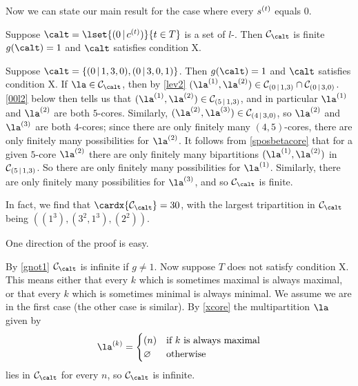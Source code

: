 \documentclass[a4paper, 11pt, twoside]{article}
\begin{document}
Now we can state our main result for the case where every $s^{(t)}$ equals $0$.

\smallskip
\begin{mdframed}[innerleftmargin=3pt,innerrightmargin=3pt,innertopmargin=-6pt,innerbottommargin=3pt,roundcorner=5pt,innermargin=-3pt,outermargin=-3pt]
\begin{thm}\label{mainall0}
Suppose $\calt=\lset{(0\,|\,\sof ct)}{t\in T}$ is a set of $l$-\mcds. Then $\smc\calt$ is finite \iff $g(\calt)=1$ and $\calt$ satisfies condition X.
\end{thm}
\end{mdframed}
\smallskip

\begin{eg}
Suppose $\calt=\{(0\,|\,1,3,0),(0\,|\,3,0,1)\}$. Then $g(\calt)=1$ and $\calt$ satisfies condition X. If $\la\in\smc\calt$, then by \cref{lev2} $(\la^{(1)},\la^{(2)})\in\mc0{1,3}\cap\mc0{3,0}$. \cref{00l2} below then tells us that $(\la^{(1)},\la^{(2)})\in\mc5{1,3}$, and in particular $\la^{(1)}$ and $\la^{(2)}$ are both $5$-cores. Similarly, $(\la^{(2)},\la^{(3)})\in\mc4{3,0}$, so $\la^{(2)}$ and $\la^{(3)}$ are both $4$-cores; since there are only finitely many $(4,5)$-cores, there are only finitely many possibilities for $\la^{(2)}$. It follows from \ref{sposbetacore} that for a given $5$-core $\la^{(2)}$ there are only finitely many bipartitions $(\la^{(1)},\la^{(2)})$ in $\mathcal{C}_{(5\,|\,1,3)}$. So there are only finitely many possibilities for $\la^{(1)}$. Similarly, there are only finitely many possibilities for $\la^{(3)}$, and so $\smc\calt$ is finite.

In fact, we find that $\cardx{\smc\calt}=30$, with the largest tripartition in $\smc\calt$ being $((1^3),(3^2,1^3),(2^2))$.
\end{eg}

One direction of the proof is easy.

\begin{pf}
By \cref{gnot1} $\smc\calt$ is infinite if $g\neq1$. Now suppose $T$ does not satisfy condition X. This means either that every $k$ which is sometimes maximal is always maximal, or that every $k$ which is sometimes minimal is always minimal. We assume we are in the first case (the other case is similar). By \cref{xcore} the multipartition $\la$ given by
\[
\cpt\la k=
\begin{cases}
(n)&\text{if $k$ is always maximal}\\
\varnothing&\text{otherwise}
\end{cases}
\]
lies in $\smc\calt$ for every $n$, so $\smc\calt$ is infinite.
\end{pf}
\end{document}
